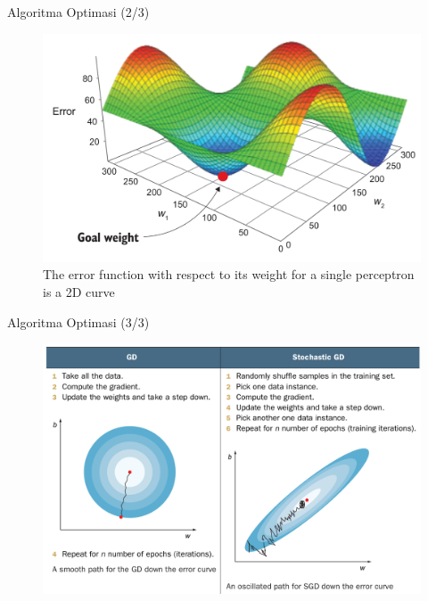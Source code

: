 \documentclass{beamer}
\begin{document}
\begin{frame}{Algoritma Optimasi (2/3)}
	\begin{figure}[ht]
		\centering
		\includegraphics[scale=0.2]{images/cost-function-3d}
		\caption{The error function with respect to its weight for a single perceptron is a 2D curve}
	\end{figure}									
\end{frame}

\begin{frame}{Algoritma Optimasi (3/3)}
	\begin{figure}[ht]
		\centering
		\includegraphics[scale=0.25]{images/gd-vs-stochastic}
	\end{figure}									
\end{frame}
\end{document}
